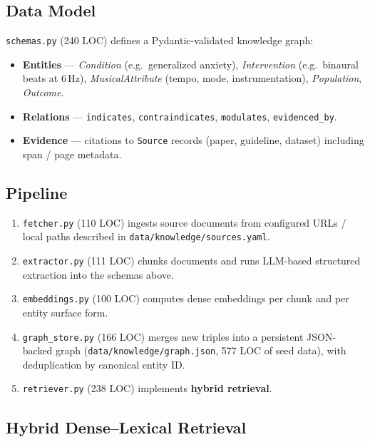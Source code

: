 \documentclass[11pt,a4paper]{article}
\begin{document}
\subsection{Data Model}

\texttt{schemas.py} (240 LOC) defines a Pydantic-validated knowledge graph:

\begin{itemize}[leftmargin=*]
  \item \textbf{Entities} --- \emph{Condition} (e.g.\ generalized anxiety),
    \emph{Intervention} (e.g.\ binaural beats at 6\,Hz), \emph{MusicalAttribute}
    (tempo, mode, instrumentation), \emph{Population}, \emph{Outcome}.
  \item \textbf{Relations} --- \texttt{indicates}, \texttt{contraindicates},
    \texttt{modulates}, \texttt{evidenced\_by}.
  \item \textbf{Evidence} --- citations to \texttt{Source} records (paper,
    guideline, dataset) including span / page metadata.
\end{itemize}

\subsection{Pipeline}

\begin{enumerate}[leftmargin=*]
  \item \texttt{fetcher.py} (110 LOC) ingests source documents from configured
    URLs / local paths described in \texttt{data/knowledge/sources.yaml}.
  \item \texttt{extractor.py} (111 LOC) chunks documents and runs LLM-based
    structured extraction into the schemas above.
  \item \texttt{embeddings.py} (100 LOC) computes dense embeddings per chunk
    and per entity surface form.
  \item \texttt{graph\_store.py} (166 LOC) merges new triples into a persistent
    JSON-backed graph (\texttt{data/knowledge/graph.json}, 577 LOC of seed
    data), with deduplication by canonical entity ID.
  \item \texttt{retriever.py} (238 LOC) implements \textbf{hybrid retrieval}.
\end{enumerate}

\subsection{Hybrid Dense--Lexical Retrieval}
\end{document}

